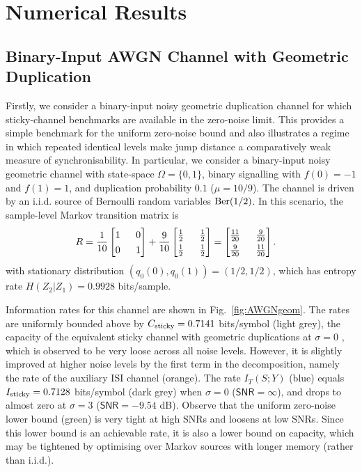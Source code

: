 \documentclass[onecolumn]{IEEEtran}
\theoremstyle{definition}
\begin{document}
\section{Numerical Results}\label{sec:numerical_results}
\subsection{Binary-Input AWGN Channel with Geometric Duplication}
{
Firstly, we consider a binary-input noisy geometric duplication channel for
which sticky-channel benchmarks are available in the zero-noise limit. This
provides a simple benchmark for the uniform zero-noise bound and also
illustrates a regime in which repeated identical levels make jump distance a
comparatively weak measure of synchronisability.} In particular, we consider a binary-input noisy geometric channel with state-space $\Omega=\{0,1\}$, binary signalling with $f(0)=-1$ and $f(1)=1$, and duplication probability $0.1$ ($\mu = 10/9$). The channel is driven by an i.i.d. source of Bernoulli random variables ${\rm Ber}(1/2)$. In this scenario, the sample-level Markov transition matrix is 
\[
\renewcommand{\arraystretch}{1.3}
\setlength{\arraycolsep}{8pt}
\begin{aligned}
R
&= \frac{1}{10}
\begin{bmatrix}
1 & 0 \\
0 & 1
\end{bmatrix}
+ \frac{9}{10}
\begin{bmatrix}
\frac{1}{2} & \frac{1}{2} \\
\frac{1}{2} & \frac{1}{2}
\end{bmatrix} =
\begin{bmatrix}
\frac{11}{20} & \frac{9}{20} \\
\frac{9}{20} & \frac{11}{20}
\end{bmatrix}.
\end{aligned}
\]
with stationary distribution $(q_0(0),q_0(1))=(1/2,1/2)$, which has entropy rate $H(Z_2|Z_1)=0.9928$ bits/sample.

Information rates for this channel are shown in Fig.~\ref{fig:AWGNgeom}. The rates are uniformly bounded above by $C_{\rm sticky}=0.7141$ bits/symbol (light grey), the capacity of the equivalent sticky channel with geometric duplications at $\sigma=0$ \cite{Mitzenmacher2007}, which is observed to be very loose across all noise levels. However, it is slightly improved at higher noise levels by the first term in the decomposition, namely the rate of the auxiliary ISI channel (orange).
The rate $I_T(S;Y)$ (blue) equals $I_{\rm sticky}=0.7128$ bits/symbol (dark grey) when $\sigma=0$ ($\mathsf{SNR}=\infty$), and drops to almost zero at $\sigma=3$ ($\mathsf{SNR}=-9.54$ dB). Observe that the uniform zero-noise lower bound (green) is very tight at high SNRs and loosens at low SNRs. Since this lower bound is an achievable rate, it is also a lower bound on capacity, which may be tightened by optimising over Markov sources with longer memory (rather than i.i.d.). 
\end{document}
